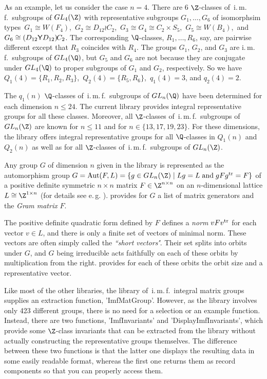 As an example, let us consider the case $n = 4$. There are 6 $\Z$-classes
of\,  i.\,m.\,f.~subgroups of  $GL_4(\Z)$ with  representative  subgroups
$G_1,  \ldots, G_6$ of isomorphsim  types\,  \mbox{$G_1 \cong W(F_4)$},\,
\mbox{$G_2  \cong  D_{12}  \wr C_2$},\,  \mbox{$G_3  \cong  G_4 \cong C_2
\times S_5$},\, \mbox{$G_5  \cong   W(B_4)$},\, and\,  \mbox{$G_6   \cong
(D_{12} {\sf Y} D_{12})   \!\:\! C_2$}. The   corresponding $\Q$-classes,
$R_1,  \ldots, R_6$,  say,   are  pairwise different   except that  $R_3$
coincides with    $R_4$.  The  groups  $G_1$,   $G_2$,  and   $G_3$   are
i.\,m.\,f.~subgroups  of $GL_4(\Q)$, but $G_5$  and $G_6$ are not because
they are   conjugate under $GL_4(\Q)$ to  proper  subgroups of  $G_1$ and
$G_2$,  respectively.    So we  have $Q_1(4) =   \{  R_1, R_2, R_3 \}$,\,
$Q_2(4) = \{ R_5, R_6 \}$,\, $q_1(4) = 3$, and $q_2(4) = 2$.

The  $q_1(n)$ $\Q$-classes  of\, i.\,m.\,f.~subgroups  of $GL_n(\Q)$ have
been   determined for  each  dimension  $n  \leq 24$.  The current {\GAP}
library provides integral representative   groups for all  these classes.
Moreover, all $\Z$-classes of\,   i.\,m.\,f.~subgroups of $GL_n(\Z)$  are
known  for  $n \leq   11$ and  for   $n \in  \{13,17,19,23\}$. For  these
dimensions,  the  library offers  integral  representative groups for all
$\Q$-classes in  $Q_1(n)$  and  $Q_2(n)$  as well as for all $\Z$-classes
of\, i.\,m.\,f.~subgroups of $GL_n(\Z)$.

Any group $G$ of dimension $n$ given in the library is represented as the
automorphism group $G = {\rm Aut}(F,L) = \{ g \in GL_n(\Z) \mid Lg = L \;
{\rm and} \; g F g^{\rm tr} =  F \}$ of a  positive definite symmetric $n
\times n$ matrix $F \in \Z^{n \times n}$ on an $n$-dimensional lattice $L
\cong \Z^{1 \times  n}$   (for details see e.\,g.    \cite{PN95}). {\GAP}
provides for $G$ a  list of matrix generators and  the {\em  Gram matrix}
$F$.

The positive definite quadratic form defined by  $F$ defines a {\em norm}
$v F v^{\rm  tr}$ for each vector  $v \in L$,  and there is only a finite
set  of vectors of  minimal norm.  These vectors  are often simply called
the {\em ``short vectors\'\'}.  Their  set splits into orbits under  $G$,
and  $G$ being irreducible   acts faithfully on  each  of these orbits by
multiplication from the right.  {\GAP} provides for  each of these orbits
the orbit size and a representative vector.

Like    most   of  the   other   {\GAP}   libraries,   the  library  of\,
i.\,m.\,f.~integral    matrix groups  supplies   an  extraction function,
'ImfMatGroup'.  However, as   the  library involves   only  423 different
groups, there is no need for a selection or an example function. Instead,
there   are  two functions, 'ImfInvariants'  and  'DisplayImfInvariants',
which provide  some $\Z$-class invariants that can  be extracted from the
library   without actually   constructing   the   representative   groups
themselves. The difference between these two functions is that the latter
one displays  the resulting data in  some easily readable format, whereas
the first one returns them as record components  so that you can properly
access them.

